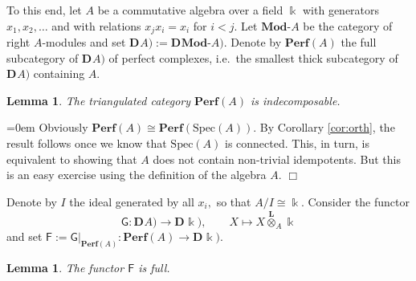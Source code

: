 \documentclass[a4paper,11pt,twoside]{amsart}
\newtheorem{lem}[thm]{Lemma}
\numberwithin{equation}{section}
\theoremstyle{definition}
\renewenvironment{proof}{\par\vspace{-5pt}\par\noindent\begingroup\leftskip=0em\hspace{0em}{\bf Proof.}}{\endgroup\hfill$\Box$}
\begin{document}
To this end, let $A$ be a commutative algebra over a field ${\Bbbk}$ with
generators $x_1, x_2, \dots$ and with relations $x_j x_i=x_i$ for
$i<j.$ Let ${{{\mathbf{{Mod}}}}\text{-}{A}}$ be the category of right $A$-modules and set
${\mathbf{D}^{}}A):={\mathbf{D}^{}}{{{\mathbf{{Mod}}}}\text{-}{A}}).$ Denote by ${{{\mathbf{{Perf}}}}}(A)$ the full subcategory of
${\mathbf{D}^{}}A)$ of perfect complexes, i.e.\ the smallest thick subcategory of
${\mathbf{D}^{}}A)$ containing $A.$

\begin{lem}\label{lem:count1}
The triangulated category ${{{\mathbf{{Perf}}}}}(A)$ is indecomposable.
\end{lem}

\begin{proof}
Obviously ${{{\mathbf{{Perf}}}}}(A){\cong}{{{\mathbf{{Perf}}}}}({\mathrm{Spec}}(A)).$ By Corollary \ref{cor:orth}, the result follows once we know that ${\mathrm{Spec}}(A)$ is connected. This, in turn, is equivalent to showing that $A$ does not contain non-trivial idempotents. But this is an easy exercise using the definition of the algebra $A.$
\end{proof}

Denote by $I$ the ideal generated by all $x_i,$ so that
$A/I{\cong}{\Bbbk}.$ Consider the functor
\[
{\mathsf{{G}}}:{\mathbf{D}^{}}A)\longrightarrow{\mathbf{D}^{}}{\Bbbk}),\qquad X\longmapsto X\stackrel{\mathbf L}{\otimes}_A{\Bbbk}
\]
and set ${\mathsf{{F}}}:={\mathsf{{G}}}{|_{{{{{\mathbf{{Perf}}}}}(A)}}}:{{{\mathbf{{Perf}}}}}(A)\to{\mathbf{D}^{}}{\Bbbk}).$

\begin{lem}\label{lem:count2}
The functor ${\mathsf{{F}}}$ is full.
\end{lem}
\end{document}
